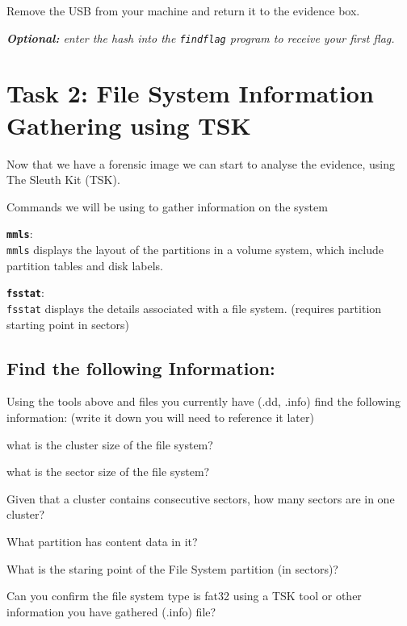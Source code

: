 \documentclass[a4paper,11pt]{article}
\begin{document}
Remove the USB from your machine and return it to the evidence box.

\textit{\textbf{Optional:} enter the hash into the \texttt{findflag} program to receive your first flag.}

\section{Task 2: File System Information Gathering using TSK}
Now that we have a forensic image we can start to analyse the evidence, using The Sleuth Kit (TSK).

Commands we will be using to gather information on the system
\begin{itemize*}
	\item \textbf{\texttt{mmls}}:\\ \texttt{mmls} displays the layout of the partitions in a volume system, which include partition tables and disk labels.
	\item \textbf{\texttt{fsstat}}:\\ \texttt{fsstat} displays the details associated with a file system. (requires partition starting point in sectors)
\end{itemize*}

\subsection*{Find the following Information:}
Using the tools above and files you currently have (.dd, .info) find the following information: (write it down you will need to reference it later)
\begin{enumerate*}
	\item what is the cluster size of the file system?
	\item what is the sector size of the file system?
	\item Given that a cluster contains consecutive sectors, how many sectors are in one cluster?
	\item What partition has content data in it?
	\item What is the staring point of the File System partition (in sectors)?
	\item Can you confirm the file system type is fat32 using a TSK tool or other information you have gathered (.info) file?
\end{enumerate*}
\end{document}

